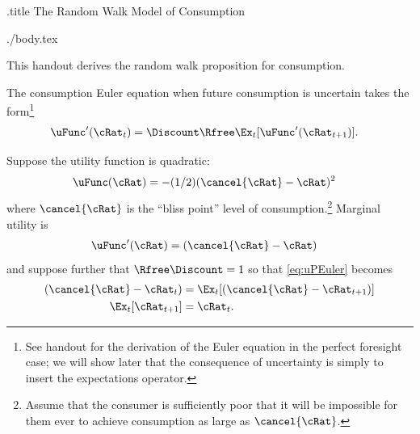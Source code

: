 \documentclass{handout}
\begin{document}
\handoutHeader

\begin{verbatimwrite}{\jobname.title}
The Random Walk Model of Consumption
\end{verbatimwrite}

\handoutNameMake

\begin{verbatimwrite}{./body.tex}

This handout derives the \cite{hallRandomWalk} random walk proposition for
consumption.

The consumption Euler equation when future consumption is uncertain
takes the form\footnote{See handout  for the derivation
of the Euler equation in the perfect foresight case; we will show later 
that the consequence of uncertainty is simply to insert the
expectations operator.}
\begin{equation}\begin{gathered}\begin{aligned}
  \uFunc^{\prime}(\cRat_{t}) & =  \Discount \Rfree \Ex_{t}[\uFunc^{\prime}(\cRat_{t+1})]. \label{eq:uPEuler}
\end{aligned}\end{gathered}\end{equation}

Suppose the utility function is quadratic:
\begin{equation}\begin{gathered}\begin{aligned}
  \uFunc(\cRat) & =  -(1/2) (\cancel{\cRat}-\cRat)^{2}
\end{aligned}\end{gathered}\end{equation}
where $\cancel{\cRat}$ is the ``bliss point'' level of consumption.\footnote{Assume that the consumer
is sufficiently poor that it will be impossible for them ever to achieve consumption as large as $\cancel{\cRat}$.}  Marginal
utility is 
\begin{equation}\begin{gathered}\begin{aligned}
  \uFunc^{\prime}(\cRat) & =   (\cancel{\cRat}-\cRat)
\end{aligned}\end{gathered}\end{equation}
and suppose further that $\Rfree \Discount = 1$ so that \eqref{eq:uPEuler} becomes
\begin{equation}\begin{gathered}\begin{aligned}
  (\cancel{\cRat}-\cRat_{t})  & =  \Ex_{t}[(\cancel{\cRat}-\cRat_{t+1})]
\\ \Ex_{t}[\cRat_{t+1}] & =  \cRat_{t}.
\end{aligned}\end{gathered}\end{equation}


\end{verbatimwrite}
\end{document}
